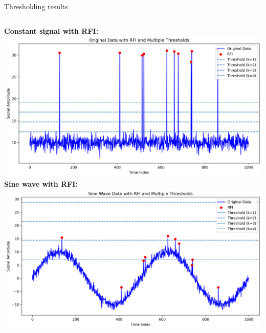 \documentclass[aspectratio=169]{beamer}
\begin{document}
\begin{frame}{Thresholding results}
  \begin{columns}
    \textbf{Constant signal with RFI:}
    \includegraphics[width=\textwidth]{images/threshold_multiple.png}
    \textbf{Sine wave with RFI:}
    \includegraphics[width=\textwidth]{images/threshold_sin_multiple.png}
  \end{columns}
\end{frame}
\end{document}
